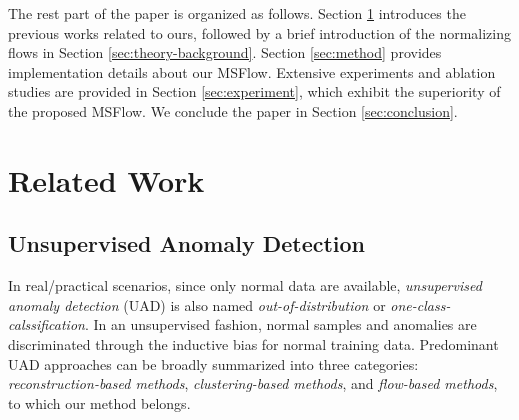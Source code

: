 \documentclass[lettersize,journal]{IEEEtran}
\begin{document}
The rest part of the paper is organized as follows. Section \ref{sec:related-work} introduces the previous works related to ours, followed by a brief introduction of the normalizing flows in Section \ref{sec:theory-background}. Section \ref{sec:method} provides implementation details about our MSFlow. Extensive experiments and ablation studies are provided in Section \ref{sec:experiment}, which exhibit the superiority of the proposed MSFlow. We conclude the paper in Section \ref{sec:conclusion}.






\section{Related Work} \label{sec:related-work}

\subsection{Unsupervised Anomaly Detection}
In real/practical scenarios, since only normal data are available, \textit{unsupervised anomaly detection} (UAD) is also named \textit{out-of-distribution} or \textit{one-class-calssification}. In an unsupervised fashion, normal samples and anomalies are discriminated through the inductive bias for normal training data. Predominant UAD approaches can be broadly summarized into three categories: \textit{reconstruction-based methods}, \textit{clustering-based methods}, and \textit{flow-based methods}, to which our method belongs.
\end{document}
